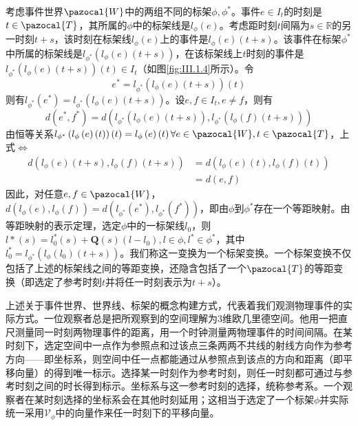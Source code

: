\documentclass[main.tex]{subfiles}
\begin{document}
考虑事件世界$\pazocal{W}$中的两组不同的标架$\phi,\phi^*$。事件$e\in I_t$的时刻是$t\in\pazocal{T}$，其所属的$\phi$中的标架线是$l_\phi\left(e\right)$。考虑距时刻$t$间隔为$s\in\mathbb{R}$的另一时刻$t+s$，该时刻在标架线$l_\phi\left(e\right)$上的事件是$l_\phi\left(e\right)\left(t+s\right)$。该事件在标架$\phi^*$中所属的标架线是$l_{\phi^*}\left(l_\phi\left(e\right)\left(t+s\right)\right)$，在该标架线上$t$时刻的事件是$l_{\phi^*}\left(l_\phi\left(e\right)\left(t+s\right)\right)\left(t\right)\in I_t$（如图\ref{fig:III.1.4}所示）。令
\[e^*=l_{\phi^*}\left(l_\phi\left(e\right)\left(t+s\right)\right)\left(t\right)\]
则有$l_{\phi^*}\left(e^*\right)=l_{\phi^*}\left(l_\phi\left(e\right)\left(t+s\right)\right)$。设$e,f\in I_t,e\neq f$，则有
\[
    d\left(e^*,f^*\right)=d\left(l_{\phi^*}\left(l_\phi\left(e\right)\left(t+s\right)\right),l_{\phi^*}\left(l_\phi\left(f\right)\left(t+s\right)\right)\right)
\]
由恒等关系$l_{\phi^*}\left(l_\phi\left(e\right)\left(t\right)\right)\left(t\right)=l_\phi\left(e\right)\left(t\right)\forall e\in\pazocal{W},t\in\pazocal{T}$，上式$\Leftrightarrow$
\begin{align*}
    d\left(l_\phi\left(e\right)\left(t+s\right),l_\phi\left(f\right)\left(t+s\right)\right) & =d\left(l_\phi\left(e\right)\left(t\right),l_\phi\left(f\right)\left(t\right)\right) \\
                                                                                            & =d\left(e,f\right)
\end{align*}
因此，对任意$e,f\in\pazocal{W}$，$d\left(l_\phi\left(e\right),l_\phi\left(f\right)\right)=d\left(l_{\phi^*}\left(e^*\right),l_{\phi^*}\left(f^*\right)\right)$，即由$\phi$到$\phi^*$存在一个等距映射。由等距映射的表示定理，选定$\phi$中的一标架线$l_0$，则$l*\left(s\right)=l_0^*\left(s\right)+\mathbf{Q}\left(s\right)\left(l-l_0\right),l\in\phi,l^*\in\phi^*$，其中$l_0^*=l_{\phi^*}\left(l_\phi\left(l_0\right)\left(t+s\right)\right)$。我们称这一变换为一个标架变换。一个标架变换不仅包括了上述的标架线之间的等距变换，还隐含包括了一个$\pazocal{T}$的等距变换（即选定了参考时刻$t$并将任一时刻表示为$t+s$）。

上述关于事件世界、世界线、标架的概念构建方式，代表着我们观测物理事件的实际方式。一位观察者总是把所观察到的空间理解为3维欧几里德空间。他用一把直尺测量同一时刻两物理事件的距离，用一个时钟测量两物理事件的时间间隔。在某时刻下，选定空间中一点作为参照点和过该点三条两两不共线的射线方向作为参考方向——即坐标系，则空间中任一点都能通过从参照点到该点的方向和距离（即平移向量）的得到唯一标示。选择某一时刻作为参考时刻，则任一时刻都可通过与参考时刻之间的时长得到标示。坐标系与这一参考时刻的选择，统称参考系。一个观察者在某时刻选择的坐标系会在其他时刻延用；这相当于选定了一个标架$\phi$并实际统一采用$\mathcal{V}_\phi$中的向量作来任一时刻下的平移向量。
\end{document}
